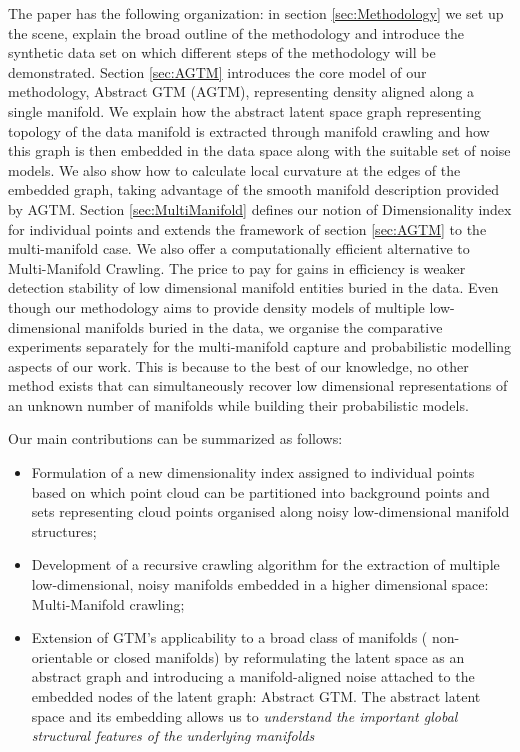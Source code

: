 The paper has the following organization: in section \ref{sec:Methodology} we set up the scene,
explain the broad outline of the methodology and introduce the synthetic data set on which different steps of the methodology will be demonstrated.
Section \ref{sec:AGTM} introduces the core model of our methodology, Abstract GTM (AGTM),
representing density aligned along a single manifold.
We explain how the abstract latent space graph representing topology of the data manifold is
extracted through manifold crawling and how this graph is then embedded in the data space along with the suitable set of noise models.
We also show how to calculate local curvature at the edges of the embedded graph,
taking advantage of the smooth manifold description provided by AGTM.
Section \ref{sec:MultiManifold} defines our notion of Dimensionality index for individual points
and extends the framework of section \ref{sec:AGTM} to the multi-manifold case.
We also offer a computationally efficient alternative to Multi-Manifold Crawling.
The price to pay for gains in efficiency is weaker detection stability of low dimensional manifold entities buried in the data.
Even though our methodology aims to provide density models of multiple low-dimensional manifolds buried in the data,
we organise the comparative experiments separately for the multi-manifold capture and probabilistic modelling aspects of our work.
This is because to the best of our knowledge, no other method exists that can simultaneously recover low dimensional
representations of an unknown number of manifolds while building their probabilistic models.

Our main contributions can be summarized as follows:
\begin{itemize}
    \item Formulation of a new dimensionality index assigned to individual points based on which point cloud can be partitioned into background points and sets representing cloud points organised along noisy low-dimensional manifold structures;
    \item Development of a recursive crawling algorithm for the extraction of multiple low-dimensional, noisy manifolds embedded in a higher dimensional space: Multi-Manifold crawling;
    \item Extension of GTM's applicability to a broad class of manifolds (\eg{} non-orientable or closed manifolds) by reformulating the latent space as an abstract graph and introducing a manifold-aligned noise attached to the embedded nodes of the latent graph: Abstract GTM.
    The abstract latent space and its embedding allows us to {\em understand the important global structural features of the underlying manifolds}
\end{itemize}

